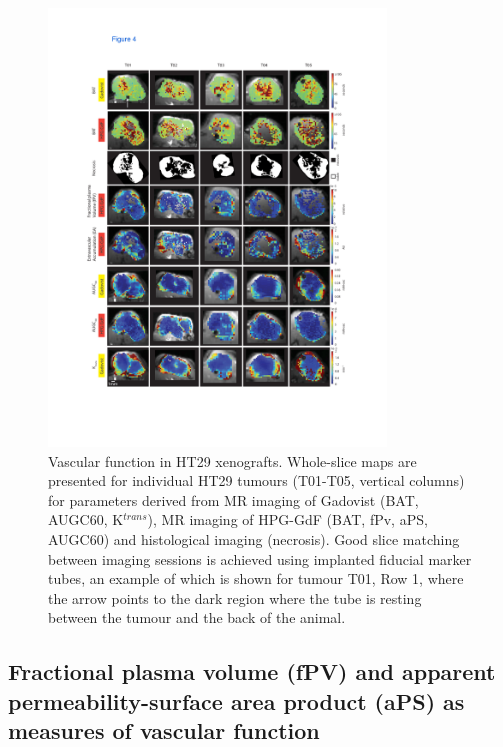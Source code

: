 \begin{figure}[htbp]
 \begin{center}
 \includegraphics[width=0.8\textwidth]{hpg/hpg-paper1-images/hpg_fig4-ht29.pdf}
 \caption{Vascular function in HT29 xenografts. Whole-slice maps are presented for individual HT29 tumours (T01-T05, vertical columns) for parameters derived from MR imaging of Gadovist (BAT, AUGC60, K$^{trans}$), MR imaging of \acs{HPG-GdF} (BAT, fPv, \acs{aPS}, AUGC60) and histological imaging (necrosis). Good slice matching between imaging sessions is achieved using implanted fiducial marker tubes, an example of which is shown for tumour T01, Row 1, where the arrow points to the dark region where the tube is resting between the tumour and the back of the animal.}
 \label{hpgpaper1:fig4}
 \end{center}
\end{figure}

\subsection{Fractional plasma volume (fPV) and apparent permeability-surface area product (aPS) as measures of vascular function}

